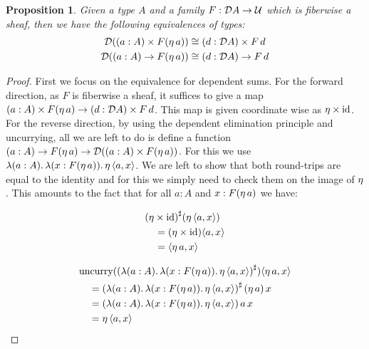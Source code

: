 \documentclass[11pt]{article}
\newtheorem{prop}[thrm]{Proposition}
\begin{document}
\begin{prop}
  Given a type \(A\) and a family \(F : \mathcal{D}{A} \to \mathcal{U}\) which is
  fiberwise a sheaf, then we have the following equivalences of types:
  \begin{align*}
    \mathcal{D}{({(a : A)}\times{F(\eta\,{a})})}
    &\cong
    {(d : \mathcal{D}{A})}\times{F\,d}
    \\
    \mathcal{D}{({{(a : A)}\to{F(\eta\,{a})}})}
    &\cong
    {{(d : \mathcal{D}{A})}\to{F\,d}}
  \end{align*}
\end{prop}
\begin{proof}
  First we focus on the equivalence for dependent sums. For the forward
  direction, as \(F\) is fiberwise a sheaf, it suffices to give a map
  \({(a : A)}\times{F(\eta\,{a})} \to {(d : \mathcal{D}{A})}\times{F\,d}\).
  This map is given coordinate wise as \({\eta}\times{\text{id}}\).
  For the reverse direction, by using the dependent elimination principle and
  uncurrying, all we are left to do is define a function
  \((a : A) \to F(\eta\,{a}) \to \mathcal{D}{({(a : A)}\times{F(\eta\,{a})})}\).
  For this we use \({\mathop{\lambda({a:A}).}{{\mathop{\lambda({x:F(\eta\,{a})}).}{\eta\,{\langle{a},{x}\rangle}}}}}\).
  We are left to show that both round-trips are equal to the identity and
  for this we simply need to check them on the image of \(\eta\).
  This amounts to the fact that for all \(a : A\) and \(x : F(\eta\,{a})\)
  we have:

  \begin{minipage}[c]{0.25\textwidth}
    \begin{align*}
      &{({\eta}\times{\text{id}})}^\sharp(\eta\,{\langle{a},{x}\rangle})
      \\
      &\quad=
        ({\eta}\times{\text{id}})\langle{a},{x}\rangle
      \\
      &\quad=
        \langle{\eta\,{a}},{x}\rangle
    \end{align*}
  \end{minipage}
  \begin{minipage}[c]{0.74\textwidth}
    \begin{align*}
      &\text{uncurry}({({\mathop{\lambda({a:A}).}{{\mathop{\lambda({x:F(\eta\,{a})}).}{\eta\,{\langle{a},{x}\rangle}}}}})}^\sharp)\langle{\eta\,{a}},{x}\rangle
      \\
      &\quad=
        {({\mathop{\lambda({a:A}).}{{\mathop{\lambda({x:F(\eta\,{a})}).}{\eta\,{\langle{a},{x}\rangle}}}}})}^\sharp\,(\eta\,{a})\,x
      \\
      &\quad=
        ({\mathop{\lambda({a:A}).}{{\mathop{\lambda({x:F(\eta\,{a})}).}{\eta\,{\langle{a},{x}\rangle}}}}})\,a\,x
      \\
      &\quad=
        \eta\,{\langle{a},{x}\rangle}
    \end{align*}
  \end{minipage}


\end{proof}
\end{document}
